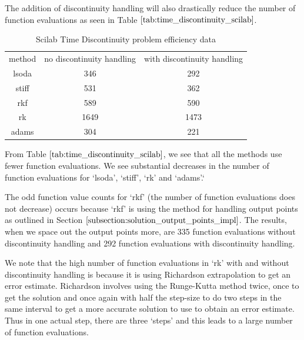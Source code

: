 The addition of discontinuity handling will also drastically reduce the number of function evaluations as seen in Table $\ref{tab:time_discontinuity_scilab}$.

\begin{table}[H]
\caption {Scilab Time Discontinuity problem efficiency data} 
\label{tab:time_discontinuity_scilab} 
\begin{center}
\begin{tabular}{ c c c }
method & no discontinuity handling & with discontinuity handling \\ 
lsoda & 346 & 292 \\
stiff & 531 & 362 \\
rkf & 589 & 590 \\
rk & 1649 & 1473 \\
adams & 304 & 221 \\
\end{tabular}
\end{center}
\end{table}

From Table $\ref{tab:time_discontinuity_scilab}$, we see that all the methods use fewer function evaluations. We see substantial decreases in the number of function evaluations for `lsoda', `stiff', `rk' and `adams'.`

The odd function value counts for `rkf' (the number of function evaluations does not decrease) occurs because `rkf' is using the method for handling output points as outlined in Section $\ref{subsection:solution_output_points_impl}$. The results, when we space out the output points more, are 335 function evaluations without discontinuity handling and 292 function evaluations with discontinuity handling.

We note that the high number of function evaluations in `rk' with and without discontinuity handling is because it is using Richardson extrapolation to get an error estimate. Richardson involves using the Runge-Kutta method twice, once to get the solution and once again with half the step-size to do two steps in the same interval to get a more accurate solution to use to obtain an error estimate. Thus in one actual step, there are three `steps' and this leads to a large number of function evaluations.

